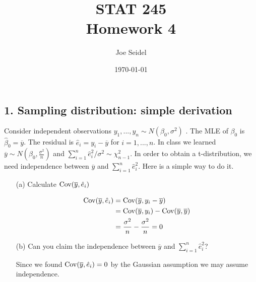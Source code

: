 \documentclass{tufte-book}
\title{STAT  245\\Homework 4}
\author{Joe Seidel}
\date{\today}
\begin{document}
\maketitle
{}
\newpage
{}

\subsection{1. Sampling distribution: simple derivation}
Consider independent observations $y_1,...,y_n \sim N(\beta_0, \sigma^2)$
.  The MLE of $\beta_0$ is $\hat{\beta}_0=\overline{y}$.  The residual is $\hat{e}_i=y_i-\overline{y}$ for $i=1,...,n$.  In class we learned $\overline{y}\sim N(\beta_0, \frac{\sigma^2}{n})$ and $\sum_{i=1}^n \hat{e}_i^2/\sigma^2 \sim \chi_{n-1}^2$.  In order to obtain a t-distribution, we need independence between $\overline{y}$ and $\sum_{i=1}^n \hat{e}_i^2$.  Here is a simple way to do it.

\begin{enumerate}

\item[(a)] Calculate $\operatorname{Cov}(\overline{y},\hat{e}_i)$

\begin{align*}
\operatorname{Cov}(\overline{y}, \hat{e}_i) &= \operatorname{Cov}(\overline{y},y_i-\overline{y})\\
&= \operatorname{Cov}(\overline{y}, y_i) - \operatorname{Cov}(\overline{y},\overline{y})\\
&= \frac{\sigma^2}{n} - \frac{\sigma^2}{n} = 0\\
\end{align*}

\item[(b)] Can you claim the independence between $\overline{y}$ and $\sum_{i=1}^n \hat{e}_i^2$?

Since we found $\operatorname{Cov}(\overline{y},\hat{e}_i)=0$ by the Gaussian assumption we may assume independence.

\end{enumerate}
\end{document}
